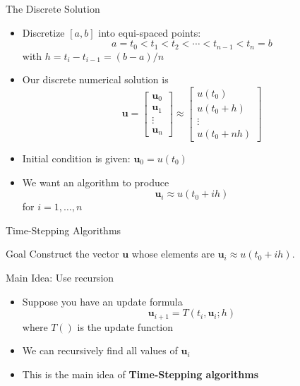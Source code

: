\documentclass[10pt]{beamer}
\begin{document}
\begin{frame}{The Discrete Solution}
\begin{itemize}
    \item Discretize $[a,b]$ into equi-spaced points:
	\[a = t_0 < t_1 < t_2 < \cdots < t_{n-1} < t_n = b\]
	with $h = t_{i} - t_{i-1} = (b-a)/n$
    \item Our discrete numerical solution is 
    \begin{equation*}
        \textbf{u} = \begin{bmatrix} \textbf{u}_0 \\ \textbf{u}_1 \\ \vdots \\  \textbf{u}_n \end{bmatrix} \approx  \begin{bmatrix} u(t_0) \\ u(t_0 + h) \\ \vdots \\  u(t_0 + nh) \end{bmatrix}
    \end{equation*}
    \item Initial condition is given: $\textbf{u}_0 = u(t_0)$ 
    \item We want an algorithm to produce 
    $$
    \textbf{u}_i \approx u(t_0 + ih)
    $$
    for $i=1,\ldots, n$
\end{itemize}
\end{frame}
\begin{frame}{Time-Stepping Algorithms}
    \begin{block}{Goal}
        Construct the vector $\textbf{u}$ whose elements are $\textbf{u}_i \approx u(t_0 + ih)$. 
    \end{block}

    \vspace{3mm}

    {}
    

    \begin{block}{Main Idea: Use recursion}
    
    \begin{itemize}
        \item Suppose you have an update formula $$\textbf{u}_{i+1} = T(t_{i},\textbf{u}_{i};h)$$ where $T()$ is the update function\\[3mm]
        \item We can recursively find all values of $\textbf{u}_i$
        \item This is the main idea of \textbf{Time-Stepping algorithms}
    \end{itemize}
    \end{block}
\end{frame}
\end{document}
